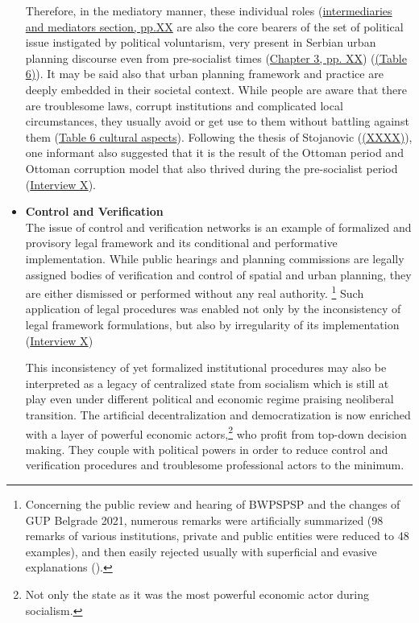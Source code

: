 \documentclass[11pt]{report}
\begin{document}
\begin{itemize}
Therefore, in the mediatory manner, these individual roles (\href{ref}{intermediaries and mediators section, pp.XX} are also the core bearers of the set of political issue  instigated by political voluntarism, very present in Serbian urban planning discourse even from pre-socialist times (\href{ref}{Chapter 3, pp. XX}) (\href{ref}{(Table 6)}).
It may be said also that urban planning framework and practice are deeply embedded in their societal context.
While people are aware that there are troublesome laws, corrupt institutions and complicated local circumstances, they usually avoid or get use to them without battling against them (\href{ref}{Table 6 cultural aspects}).
Following the thesis of Stojanovic (\href{ref}{(XXXX)}), one informant also suggested that it is the result of the Ottoman period and Ottoman corruption model that also thrived during the pre-socialist period (\href{InterviewX}{Interview X}).
\\

\item \textbf{Control and Verification}
\\
The issue of control and verification networks is an example of formalized and provisory legal framework and its conditional and performative implementation. While public hearings and planning commissions are legally assigned bodies of verification and control of spatial and urban planning, they are either dismissed or performed without any real authority.
\footnote{Concerning the public review and hearing of BWPSPSP and the changes of GUP Belgrade 2021, numerous remarks were artificially summarized (98 remarks of various institutions, private and public entities were reduced to 48 examples), and then easily rejected usually with superficial and evasive explanations (\cite{Alternativni izvestaj}).}
Such application of legal procedures was enabled  not only by the inconsistency of legal framework formulations, but also by irregularity of its implementation (\href{InterviewX}{Interview X})

This inconsistency of yet formalized institutional procedures may also be interpreted as a legacy of centralized state from socialism which is still at play even under different political and economic regime praising neoliberal transition.
The artificial decentralization and democratization is now enriched with a layer of powerful economic actors,\footnote{Not only the state as it was  the most powerful economic actor during socialism.}
who profit from top-down decision making.
They couple with political powers in order to reduce control and verification procedures and troublesome professional actors to the minimum.
\\


\end{itemize}
\end{document}
